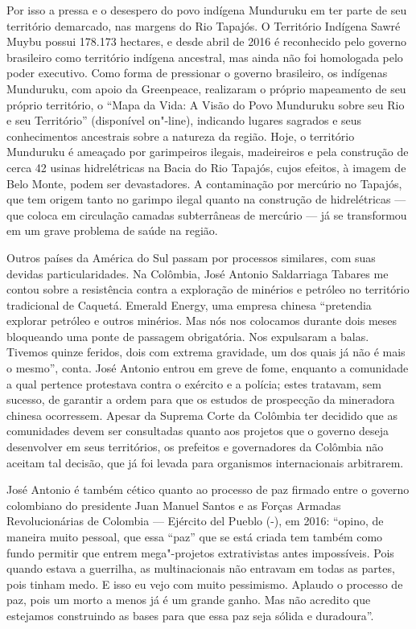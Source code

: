 Por isso a pressa e o desespero do povo indígena Munduruku em ter parte
de seu território demarcado, nas margens do Rio Tapajós. O Território
Indígena Sawré Muybu possui 178.173 hectares, e desde abril de 2016 é
reconhecido pelo governo brasileiro como território indígena ancestral,
mas ainda não foi homologada pelo poder executivo. Como forma de
pressionar o governo brasileiro, os indígenas Munduruku, com apoio da
 Greenpeace, realizaram o próprio mapeamento de seu próprio
território, o ``Mapa da Vida: A Visão do Povo Munduruku sobre seu Rio e
seu Território'' (disponível on"-line), indicando lugares sagrados e seus
conhecimentos ancestrais sobre a natureza da região. Hoje, o território
Munduruku é ameaçado por garimpeiros ilegais, madeireiros e pela
construção de cerca 42 usinas hidrelétricas na Bacia do Rio Tapajós,
cujos efeitos, à imagem de Belo Monte, podem ser devastadores. A
contaminação por mercúrio no Tapajós, que tem origem tanto no garimpo
ilegal quanto na construção de hidrelétricas --- que coloca em circulação
camadas subterrâneas de mercúrio --- já se transformou em um grave
problema de saúde na região.

\asterisc

Outros países da América do Sul passam por processos similares, com suas
devidas particularidades. Na Colômbia, José Antonio Saldarriaga Tabares
me contou sobre a resistência contra a exploração de minérios e petróleo
no território tradicional de Caquetá. Emerald Energy, uma empresa
chinesa ``pretendia explorar petróleo e outros minérios. Mas nós nos
colocamos durante dois meses bloqueando uma ponte de passagem
obrigatória. Nos expulsaram a balas. Tivemos quinze feridos, dois com
extrema gravidade, um dos quais já não é mais o mesmo'', conta. José
Antonio entrou em greve de fome, enquanto a comunidade a qual pertence
protestava contra o exército e a polícia; estes tratavam, sem sucesso,
de garantir a ordem para que os estudos de prospecção da mineradora
chinesa ocorressem. Apesar da Suprema Corte da Colômbia ter decidido que
as comunidades devem ser consultadas quanto aos projetos que o governo
deseja desenvolver em seus territórios, os prefeitos e governadores da
Colômbia não aceitam tal decisão, que já foi levada para organismos
internacionais arbitrarem.

José Antonio é também cético quanto ao processo de paz firmado entre o
governo colombiano do presidente Juan Manuel Santos e as Forças Armadas
Revolucionárias de Colombia --- Ejército del Pueblo (-), em 2016:
``opino, de maneira muito pessoal, que essa ``paz'' que se está criada
tem também como fundo permitir que entrem mega"-projetos extrativistas
antes impossíveis. Pois quando estava a guerrilha, as multinacionais não
entravam em todas as partes, pois tinham medo. E isso eu vejo com muito
pessimismo. Aplaudo o processo de paz, pois um morto a menos já é um
grande ganho. Mas não acredito que estejamos construindo as bases para
que essa paz seja sólida e duradoura''.

